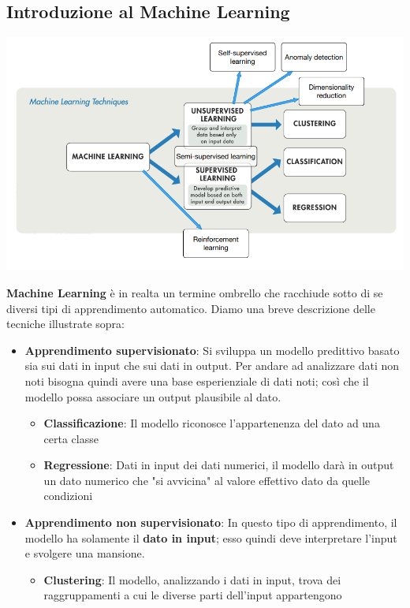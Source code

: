 \documentclass[12pt]{article}
\begin{document}
\subsection{Introduzione al Machine Learning}
\begin{center}
    \includegraphics[width =0.95\linewidth]{Images/58.PNG}
\end{center}
\textbf{Machine Learning} è in realta un termine ombrello che racchiude sotto di se diversi tipi di apprendimento automatico.
Diamo una breve descrizione delle tecniche illustrate sopra:
\begin{itemize}
    \item \textbf{Apprendimento supervisionato}: Si sviluppa un modello predittivo basato sia sui dati in input che sui dati in output. Per andare ad analizzare dati non noti bisogna quindi avere una base esperienziale di dati noti; così che il modello possa associare un output plausibile al dato.
    \begin{itemize}
        \item \textbf{Classificazione}: Il modello riconosce l'appartenenza del dato ad una certa classe
        \item \textbf{Regressione}: Dati in input dei dati numerici, il modello darà in output un dato numerico che "si avvicina" al valore effettivo dato da quelle condizioni
    \end{itemize}
    \item \textbf{Apprendimento non supervisionato}: In questo tipo di apprendimento, il modello ha solamente il \textbf{dato in input}; esso quindi deve interpretare l'input e svolgere una mansione.
    \begin{itemize}
        \item \textbf{Clustering}: Il modello, analizzando i dati in input, trova dei raggruppamenti a cui le diverse parti dell'input appartengono
    \end{itemize} 
\end{itemize}
\end{document}
